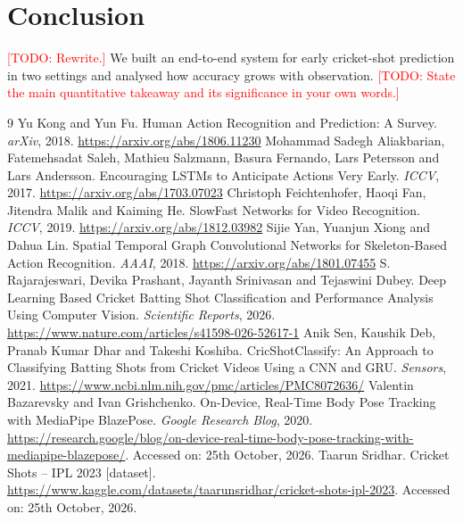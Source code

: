 \documentclass[11pt]{article}
\newcommand{\TODO}[1]{\textcolor{red}{[TODO: #1]}}
\begin{document}
\section{Conclusion}
\TODO{Rewrite.} We built an end-to-end system for early cricket-shot prediction
in two settings and analysed how accuracy grows with observation. \TODO{State
the main quantitative takeaway and its significance in your own words.}

\begin{thebibliography}{9}
 Yu Kong and Yun Fu. Human Action Recognition and Prediction: A Survey. \textit{arXiv}, 2018. \url{https://arxiv.org/abs/1806.11230}
 Mohammad Sadegh Aliakbarian, Fatemehsadat Saleh, Mathieu Salzmann, Basura Fernando, Lars Petersson and Lars Andersson. Encouraging LSTMs to Anticipate Actions Very Early. \textit{ICCV}, 2017. \url{https://arxiv.org/abs/1703.07023}
 Christoph Feichtenhofer, Haoqi Fan, Jitendra Malik and Kaiming He. SlowFast Networks for Video Recognition. \textit{ICCV}, 2019. \url{https://arxiv.org/abs/1812.03982}
 Sijie Yan, Yuanjun Xiong and Dahua Lin. Spatial Temporal Graph Convolutional Networks for Skeleton-Based Action Recognition. \textit{AAAI}, 2018. \url{https://arxiv.org/abs/1801.07455}
 S. Rajarajeswari, Devika Prashant, Jayanth Srinivasan and Tejaswini Dubey. Deep Learning Based Cricket Batting Shot Classification and Performance Analysis Using Computer Vision. \textit{Scientific Reports}, 2026. \url{https://www.nature.com/articles/s41598-026-52617-1}
 Anik Sen, Kaushik Deb, Pranab Kumar Dhar and Takeshi Koshiba. CricShotClassify: An Approach to Classifying Batting Shots from Cricket Videos Using a CNN and GRU. \textit{Sensors}, 2021. \url{https://www.ncbi.nlm.nih.gov/pmc/articles/PMC8072636/}
 Valentin Bazarevsky and Ivan Grishchenko. On-Device, Real-Time Body Pose Tracking with MediaPipe BlazePose. \textit{Google Research Blog}, 2020. \url{https://research.google/blog/on-device-real-time-body-pose-tracking-with-mediapipe-blazepose/}. Accessed on: 25th October, 2026.
 Taarun Sridhar. Cricket Shots -- IPL 2023 [dataset]. \url{https://www.kaggle.com/datasets/taarunsridhar/cricket-shots-ipl-2023}. Accessed on: 25th October, 2026.
\end{thebibliography}
\end{document}
